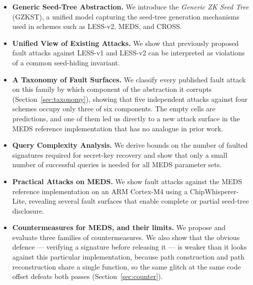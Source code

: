 \begin{itemize}

\item \textbf{Generic Seed-Tree Abstraction.}
We introduce the \emph{Generic ZK Seed Tree} (GZKST), a unified model
capturing the seed-tree generation mechanisms used in schemes such as
LESS-v2, MEDS, and CROSS.

\item \textbf{Unified View of Existing Attacks.}
We show that previously proposed fault attacks against LESS-v1 and
LESS-v2 can be interpreted as violations of a common seed-hiding
invariant.

\item \textbf{A Taxonomy of Fault Surfaces.}
We classify every published fault attack on this family by which component
of the abstraction it corrupts (Section~\ref{sec:taxonomy}), showing that
five independent attacks against four schemes occupy only three of six
components. The empty cells are predictions, and one of them led us
directly to a new attack surface in the MEDS reference implementation
that has no analogue in prior work.

\item \textbf{Query Complexity Analysis.}
We derive bounds on the number of faulted signatures required for
secret-key recovery and show that only a small number of successful
queries is needed for all MEDS parameter sets.

\item \textbf{Practical Attacks on MEDS.}
We show fault attacks against the MEDS reference
implementation on an ARM Cortex-M4 using a ChipWhisperer-Lite,
revealing several fault surfaces that enable complete or partial
seed-tree disclosure.

\item \textbf{Countermeasures for MEDS, and their limits.}
We propose and evaluate three families of countermeasures. We also show
that the obvious defence --- verifying a signature before releasing it ---
is weaker than it looks against this particular implementation, because
path construction and path reconstruction share a single function, so the
same glitch at the same code offset defeats both passes
(Section~\ref{sec:counter}).

\end{itemize}

